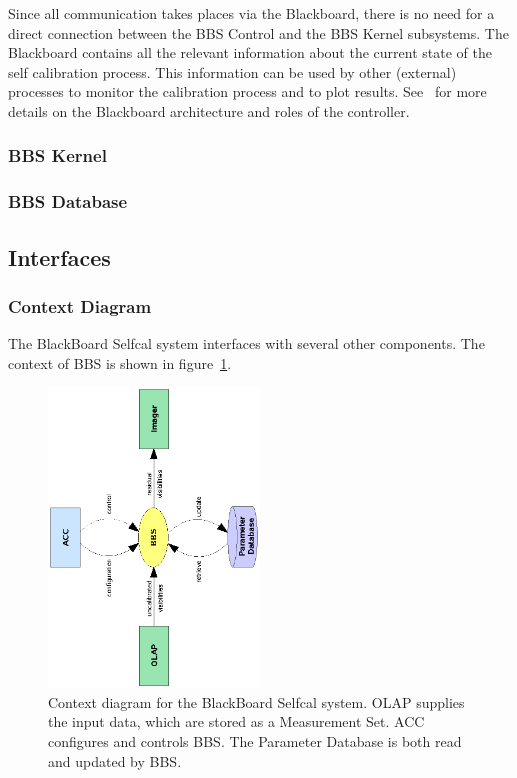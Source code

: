 \documentclass[10pt]{lofar}
\begin{document}
Since all communication takes places via the Blackboard, there is no need for
a direct connection between the BBS Control and the BBS Kernel subsystems.
The Blackboard contains all the relevant information about the current state
of the self calibration process. This information can be used by other
(external) processes to monitor the calibration process and to plot results.
See~\cite{LOFAR-ASTRON-SDD-002} for more details on the Blackboard
architecture and roles of the controller.


\subsubsection{BBS Kernel}
\label{subsubsec:sys-kernel}

\subsubsection{BBS Database}
\label{subsubsec:sys-database}

\subsection{Interfaces}
\label{subsec:sys-interfaces}

\subsubsection{Context Diagram}
\label{subsubsec:context}
The BlackBoard Selfcal system interfaces with several other components. The context of BBS is shown in figure~\ref{fig:bbs-context-diagram}.

\begin{figure}[!ht]
\centering
\includegraphics[width=0.5\textwidth,angle=-90]{images/bbs-context-diagram}
\caption{Context diagram for the BlackBoard Selfcal system. OLAP supplies the
input data, which are stored as a Measurement Set. ACC configures and controls
BBS. The Parameter Database
is both read and updated by BBS.}
\label{fig:bbs-context-diagram}
\end{figure}
\end{document}
